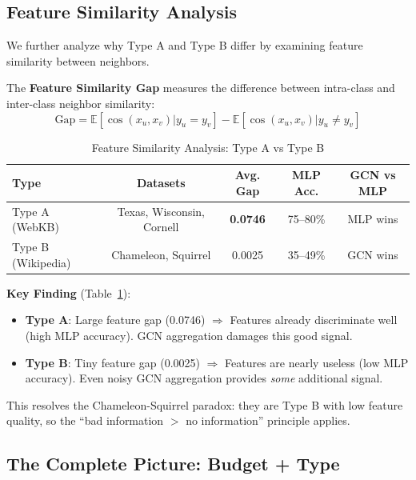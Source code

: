 \subsection{Feature Similarity Analysis}

We further analyze why Type A and Type B differ by examining feature similarity between neighbors.

\begin{definition}
\label{def:feature_gap}
The \textbf{Feature Similarity Gap} measures the difference between intra-class and inter-class neighbor similarity:
\begin{equation}
    \text{Gap} = \mathbb{E}[\cos(x_u, x_v) | y_u = y_v] - \mathbb{E}[\cos(x_u, x_v) | y_u \neq y_v]
\end{equation}
\end{definition}

\begin{table}[t]
\centering
\caption{Feature Similarity Analysis: Type A vs Type B}
\label{tab:feature_similarity}
\begin{tabular}{@{}lcccc@{}}
\toprule
\textbf{Type} & \textbf{Datasets} & \textbf{Avg. Gap} & \textbf{MLP Acc.} & \textbf{GCN vs MLP} \\
\midrule
Type A (WebKB) & Texas, Wisconsin, Cornell & \textbf{0.0746} & 75--80\% & MLP wins \\
Type B (Wikipedia) & Chameleon, Squirrel & 0.0025 & 35--49\% & GCN wins \\
\bottomrule
\end{tabular}
\end{table}

\textbf{Key Finding} (Table~\ref{tab:feature_similarity}):
\begin{itemize}
    \item \textbf{Type A}: Large feature gap (0.0746) $\Rightarrow$ Features already discriminate well (high MLP accuracy). GCN aggregation damages this good signal.

    \item \textbf{Type B}: Tiny feature gap (0.0025) $\Rightarrow$ Features are nearly useless (low MLP accuracy). Even noisy GCN aggregation provides \textit{some} additional signal.
\end{itemize}

This resolves the Chameleon-Squirrel paradox: they are Type B with low feature quality, so the ``bad information $>$ no information'' principle applies.

\subsection{The Complete Picture: Budget + Type}

